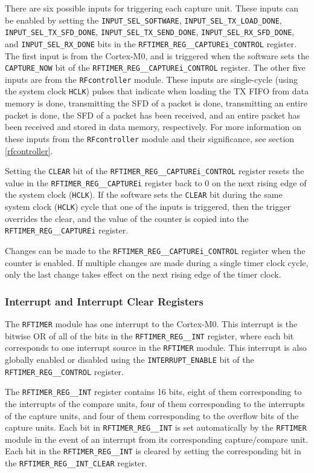 There are six possible inputs for triggering each capture unit. These inputs can be enabled by setting the \texttt{INPUT\_SEL\_SOFTWARE}, \texttt{INPUT\_SEL\_TX\_LOAD\_DONE}, \texttt{INPUT\_SEL\_TX\_SFD\_DONE}, \texttt{INPUT\_SEL\_TX\_SEND\_DONE}, \texttt{INPUT\_SEL\_RX\_SFD\_DONE}, and \texttt{INPUT\_SEL\_RX\_DONE} bits in the \texttt{RFTIMER\_REG\_\_CAPTUREi\_CONTROL} register. The first input is from the Cortex-M0, and is triggered when the software sets the \texttt{CAPTURE\_NOW} bit of the \texttt{RFTIMER\_REG\_\_CAPTUREi\_CONTROL} register. The other five inputs are from the \texttt{RFcontroller} module. These inputs are single-cycle (using the system clock \texttt{HCLK}) pulses that indicate when loading the TX FIFO from data memory is done, transmitting the SFD of a packet is done, transmitting an entire packet is done, the SFD of a packet has been received, and an entire packet has been received and stored in data memory, respectively. For more information on these inputs from the \texttt{RFcontroller} module and their significance, see section \ref{rfcontroller}.

Setting the \texttt{CLEAR} bit of the \texttt{RFTIMER\_REG\_\_CAPTUREi\_CONTROL} register resets the value in the \texttt{RFTIMER\_REG\_\_CAPTUREi} register back to 0 on the next rising edge of the system clock (\texttt{HCLK}). If the software sets the \texttt{CLEAR} bit during the same system clock (\texttt{HCLK}) cycle that one of the inputs is triggered, then the trigger overrides the clear, and the value of the counter is copied into the \texttt{RFTIMER\_REG\_\_CAPTUREi} register.

Changes can be made to the \texttt{RFTIMER\_REG\_\_CAPTUREi\_CONTROL} register when the counter is enabled. If multiple changes are made during a single timer clock cycle, only the last change takes effect on the next rising edge of the timer clock.

\subsubsection{Interrupt and Interrupt Clear Registers}
The \texttt{RFTIMER} module has one interrupt to the Cortex-M0. This interrupt is the bitwise OR of all of the bits in the \texttt{RFTIMER\_REG\_\_INT} register, where each bit corresponds to one interrupt source in the \texttt{RFTIMER} module. This interrupt is also globally enabled or disabled using the \texttt{INTERRUPT\_ENABLE} bit of the \texttt{RFTIMER\_REG\_\_CONTROL} register.

The \texttt{RFTIMER\_REG\_\_INT} register contains 16 bits, eight of them corresponding to the interrupts of the compare units, four of them corresponding to the interrupts of the capture units, and four of them corresponding to the overflow bits of the capture units. Each bit in \texttt{RFTIMER\_REG\_\_INT} is set automatically by the \texttt{RFTIMER} module in the event of an interrupt from its corresponding capture/compare unit. Each bit in the \texttt{RFTIMER\_REG\_\_INT} is cleared by setting the corresponding bit in the \texttt{RFTIMER\_REG\_\_INT\_CLEAR} register.

